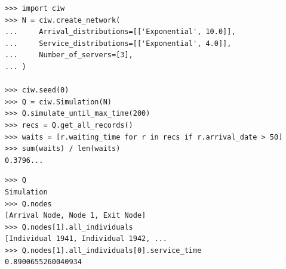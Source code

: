 \documentclass[usenames,dvipsnames,t]{beamer}
\begin{document}
\begin{columns}
\begin{column}{0.5\textwidth}
  \begin{center}
  \begin{minipage}[c]{0.9\textwidth}
    \begin{tcolorbox}[boxrule=2pt, colback=ciwyellow!15,colframe=ciwyellow, title=\small{READABLE}, coltitle=white, halign title=right]
      \begin{center}
        \small{
          \begin{verbatim}
>>> import ciw
>>> N = ciw.create_network(
...     Arrival_distributions=[['Exponential', 10.0]],
...     Service_distributions=[['Exponential', 4.0]],
...     Number_of_servers=[3],
... )

>>> ciw.seed(0)
>>> Q = ciw.Simulation(N)
>>> Q.simulate_until_max_time(200)
>>> recs = Q.get_all_records()
>>> waits = [r.waiting_time for r in recs if r.arrival_date > 50]
>>> sum(waits) / len(waits)
0.3796...
          \end{verbatim}
        }
      \end{center}
    \end{tcolorbox}
    \vspace{10mm}
    \begin{tcolorbox}[boxrule=2pt, colback=mplblue!15,colframe=mplblue, title=\small{MODULAR}, coltitle=white, halign title=right]
          \begin{center}
            
          \end{center}
          \small{
            \begin{verbatim}
>>> Q
Simulation
>>> Q.nodes
[Arrival Node, Node 1, Exit Node]
>>> Q.nodes[1].all_individuals
[Individual 1941, Individual 1942, ...
>>> Q.nodes[1].all_individuals[0].service_time
0.8900655260040934
            \end{verbatim}
          }
    \end{tcolorbox}
    \vspace{10mm}
    \begin{tcolorbox}[boxrule=2pt, colback=textorange!15,colframe=textorange, title=\small{EXTENDIBLE}, coltitle=white, halign title=right]
    \begin{columns}
    \hspace{0.02\textwidth}
    \begin{column}{0.32\textwidth}
      \begin{center}
      \end{center}

\end{column}
\end{columns}
\end{tcolorbox}
\end{minipage}
\end{center}
\end{column}
\end{columns}
\end{document}
